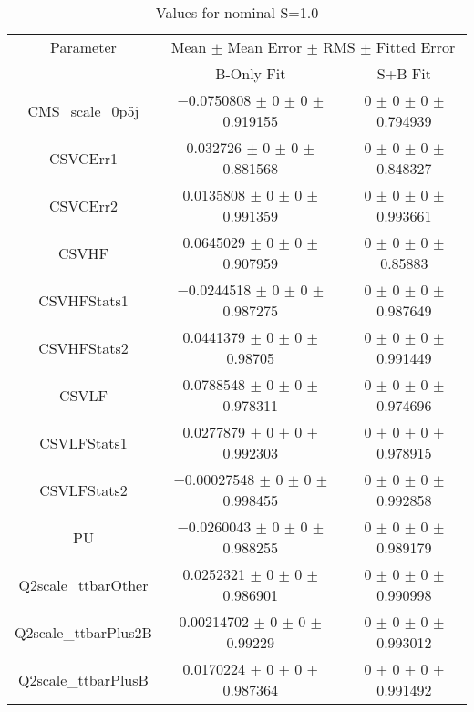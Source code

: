 \begin{table}
\centering
\caption{Values for nominal S=1.0}
\begin{tabular}{ccc}
\toprule
Parameter & \multicolumn{2}{c}{Mean $\pm$ Mean Error $\pm$ RMS $\pm$ Fitted Error}\\
 & B-Only Fit & S+B Fit\\
\midrule
CMS\_scale\_0p5j & \num{-0.0750808} $\pm$ \num{0} $\pm$ \num{0} $\pm$ \num{0.919155} & \num{0} $\pm$ \num{0} $\pm$ \num{0} $\pm$ \num{0.794939}\\
CSVCErr1 & \num{0.032726} $\pm$ \num{0} $\pm$ \num{0} $\pm$ \num{0.881568} & \num{0} $\pm$ \num{0} $\pm$ \num{0} $\pm$ \num{0.848327}\\
CSVCErr2 & \num{0.0135808} $\pm$ \num{0} $\pm$ \num{0} $\pm$ \num{0.991359} & \num{0} $\pm$ \num{0} $\pm$ \num{0} $\pm$ \num{0.993661}\\
CSVHF & \num{0.0645029} $\pm$ \num{0} $\pm$ \num{0} $\pm$ \num{0.907959} & \num{0} $\pm$ \num{0} $\pm$ \num{0} $\pm$ \num{0.85883}\\
CSVHFStats1 & \num{-0.0244518} $\pm$ \num{0} $\pm$ \num{0} $\pm$ \num{0.987275} & \num{0} $\pm$ \num{0} $\pm$ \num{0} $\pm$ \num{0.987649}\\
CSVHFStats2 & \num{0.0441379} $\pm$ \num{0} $\pm$ \num{0} $\pm$ \num{0.98705} & \num{0} $\pm$ \num{0} $\pm$ \num{0} $\pm$ \num{0.991449}\\
CSVLF & \num{0.0788548} $\pm$ \num{0} $\pm$ \num{0} $\pm$ \num{0.978311} & \num{0} $\pm$ \num{0} $\pm$ \num{0} $\pm$ \num{0.974696}\\
CSVLFStats1 & \num{0.0277879} $\pm$ \num{0} $\pm$ \num{0} $\pm$ \num{0.992303} & \num{0} $\pm$ \num{0} $\pm$ \num{0} $\pm$ \num{0.978915}\\
CSVLFStats2 & \num{-0.00027548} $\pm$ \num{0} $\pm$ \num{0} $\pm$ \num{0.998455} & \num{0} $\pm$ \num{0} $\pm$ \num{0} $\pm$ \num{0.992858}\\
PU & \num{-0.0260043} $\pm$ \num{0} $\pm$ \num{0} $\pm$ \num{0.988255} & \num{0} $\pm$ \num{0} $\pm$ \num{0} $\pm$ \num{0.989179}\\
Q2scale\_ttbarOther & \num{0.0252321} $\pm$ \num{0} $\pm$ \num{0} $\pm$ \num{0.986901} & \num{0} $\pm$ \num{0} $\pm$ \num{0} $\pm$ \num{0.990998}\\
Q2scale\_ttbarPlus2B & \num{0.00214702} $\pm$ \num{0} $\pm$ \num{0} $\pm$ \num{0.99229} & \num{0} $\pm$ \num{0} $\pm$ \num{0} $\pm$ \num{0.993012}\\
Q2scale\_ttbarPlusB & \num{0.0170224} $\pm$ \num{0} $\pm$ \num{0} $\pm$ \num{0.987364} & \num{0} $\pm$ \num{0} $\pm$ \num{0} $\pm$ \num{0.991492}\\

\end{tabular}
\end{table}
